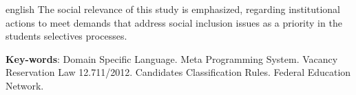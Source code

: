 \begin{resumo}[Abstract]
\begin{otherlanguage*}{english}
The social relevance of this study is emphasized, regarding institutional actions to meet demands that address social inclusion issues as a priority in the students selectives processes.



   \vspace{\onelineskip} 
 
   \noindent 
   \textbf{Key-words}: Domain Specific Language. Meta Programming System. Vacancy Reservation Law 12.711/2012. Candidates Classification Rules. Federal Education Network.
 \end{otherlanguage*}
 \end{resumo}
